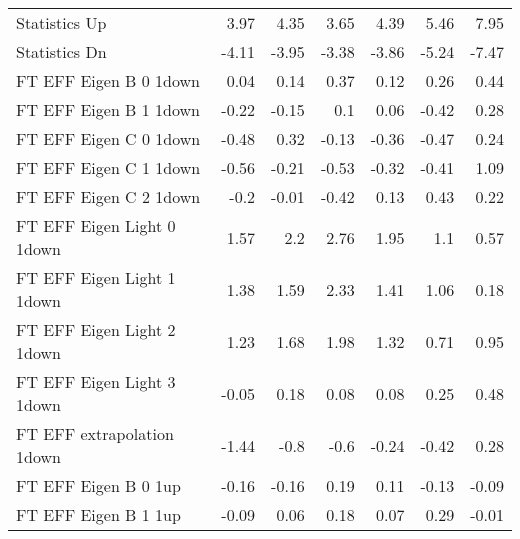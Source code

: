 \begin{table}[htbp]
{\begin{tabular}{lrrrrrr}
Statistics Up                             & 3.97               & 4.35               & 3.65              & 4.39              & 5.46              & 7.95              \\
Statistics Dn                             & -4.11              & -3.95              & -3.38             & -3.86             & -5.24             & -7.47             \\
FT EFF Eigen B 0  1down      & 0.04               & 0.14               & 0.37              & 0.12              & 0.26              & 0.44              \\
FT EFF Eigen B 1  1down      & -0.22              & -0.15              & 0.1               & 0.06              & -0.42             & 0.28              \\
FT EFF Eigen C 0  1down      & -0.48              & 0.32               & -0.13             & -0.36             & -0.47             & 0.24              \\
FT EFF Eigen C 1  1down      & -0.56              & -0.21              & -0.53             & -0.32             & -0.41             & 1.09              \\
FT EFF Eigen C 2  1down      & -0.2               & -0.01              & -0.42             & 0.13              & 0.43              & 0.22              \\
FT EFF Eigen Light 0  1down  & 1.57               & 2.2                & 2.76              & 1.95              & 1.1               & 0.57              \\
FT EFF Eigen Light 1  1down  & 1.38               & 1.59               & 2.33              & 1.41              & 1.06              & 0.18              \\
FT EFF Eigen Light 2  1down  & 1.23               & 1.68               & 1.98              & 1.32              & 0.71              & 0.95              \\
FT EFF Eigen Light 3  1down  & -0.05              & 0.18               & 0.08              & 0.08              & 0.25              & 0.48              \\
FT EFF extrapolation  1down    & -1.44              & -0.8               & -0.6              & -0.24             & -0.42             & 0.28              \\
FT EFF Eigen B 0  1up        & -0.16              & -0.16              & 0.19              & 0.11              & -0.13             & -0.09             \\
FT EFF Eigen B 1  1up        & -0.09              & 0.06               & 0.18              & 0.07              & 0.29              & -0.01             \\

\end{tabular}}
\end{table}
